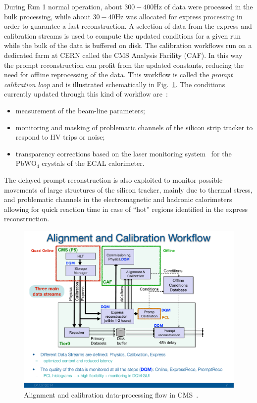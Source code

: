 During Run 1 normal operation, about $300-400$\unit{Hz} of data 
were processed in the bulk processing, while about $30-40$\unit{Hz} was allocated for express
processing in order to guarantee a fast reconstruction. A selection of
data from the express and calibration streams is used
to compute the updated conditions for a given run while the bulk of
the data is buffered on disk. The calibration workflows run on a
dedicated farm at CERN called the CMS Analysis Facility (CAF). In this
way the prompt reconstruction can profit from the updated constants,
reducing the need for offline reprocessing of the data. This workflow
is called the \emph{prompt calibration loop} and is illustrated schematically
in Fig.~\ref{fig:AlCa}. The conditions currently updated through this kind of
workflow are~\cite{Cerminara:1399496,2012AIPC.1504..971E,DeGuio:2121268}:
\begin{itemize}
\item measurement of the beam-line parameters;
\item monitoring and masking of problematic channels of the silicon strip tracker to respond to
HV trips or noise;
\item transparency corrections based on the laser monitoring system~\cite{Anfreville:2007zz,Zhang:2005ip} for the PbWO$_4$ crystals of the ECAL
  calorimeter.
\end{itemize}
The delayed prompt reconstruction is also exploited to
monitor possible movements of large structures of the silicon tracker,
mainly due to thermal stress, and problematic channels in the
electromagnetic and hadronic calorimeters allowing for quick reaction
time in case of ``hot'' regions identified in the express
reconstruction.

\begin{figure}\centering
\includegraphics[width=.9\textwidth,clip=true,viewport=0 180 900 700]{figs/cms/AlCa.pdf}
\caption{Alignment and calibration data-processing flow in CMS~\cite{DeGuio:2121268}.\label{fig:AlCa}}
\end{figure}

